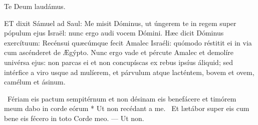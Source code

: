 Te Deum laudámus.








\lettrine[lines=2]{E}{T} dixit Sámuel ad Saul: Me misit Dóminus, ut úngerem te in regem super pópulum ejus Israël: nunc ergo audi vocem Dómini. Hæc dicit Dóminus exercítuum: Recénsui quæcúmque fecit Amalec Israéli: quómodo réstitit ei in via cum ascénderet de Ægýpto. Nunc ergo vade et pércute Amalec et demolíre univérsa ejus: non parcas ei et non concupíscas ex rebus ipsíus áliquid; sed intérfice a viro usque ad mulíerem, et párvulum atque lacténtem, bovem et ovem, camélum et ásinum.

\R\ Fériam eis pactum sempitérnum et non désinam eis benefácere et timórem meum dabo in corde eórum * Ut non recédant a me. \V\ Et lætábor super eis cum bene eis fécero in toto Corde meo. --- Ut non.


